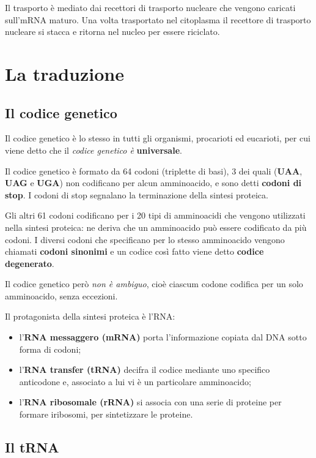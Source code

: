 \documentclass[11pt]{book}
\begin{document}
Il trasporto è mediato dai recettori di trasporto nucleare che vengono
caricati sull'mRNA maturo. Una volta trasportato nel citoplasma il
recettore di trasporto nucleare si stacca e ritorna nel nucleo per
essere riciclato.

\chapter{La traduzione}\label{la-traduzione}

\section{Il codice genetico}\label{il-codice-genetico}

Il codice genetico è lo stesso in tutti gli organismi, procarioti ed
eucarioti, per cui viene detto che il \emph{codice genetico è}
\textbf{universale}.

Il codice genetico è formato da 64 codoni (triplette di basi), 3 dei
quali (\textbf{UAA}, \textbf{UAG} e \textbf{UGA}) non codificano per
alcun amminoacido, e sono detti \textbf{codoni di stop}. I codoni di
stop segnalano la terminazione della sintesi proteica.

Gli altri 61 codoni codificano per i 20 tipi di amminoacidi che vengono
utilizzati nella sintesi proteica: ne deriva che un amminoacido può
essere codificato da più codoni. I diversi codoni che specificano per lo
stesso amminoacido vengono chiamati \textbf{codoni sinonimi} e un codice
così fatto viene detto \textbf{codice degenerato}.

Il codice genetico però \emph{non è ambiguo}, cioè ciascum codone
codifica per un solo amminoacido, senza eccezioni.

Il protagonista della sintesi proteica è l'RNA:

\begin{itemize}
\itemsep1pt\parskip0pt
\item
  l'\textbf{RNA messaggero (mRNA)} porta l'informazione copiata dal DNA
  sotto forma di codoni;
\item
  l'\textbf{RNA transfer (tRNA)} decifra il codice mediante uno
  specifico anticodone e, associato a lui vi è un particolare
  amminoacido;
\item
  l'\textbf{RNA ribosomale (rRNA)} si associa con una serie di proteine
  per formare iribosomi, per sintetizzare le proteine.
\end{itemize}

\section{Il tRNA}\label{il-trna}
\end{document}
